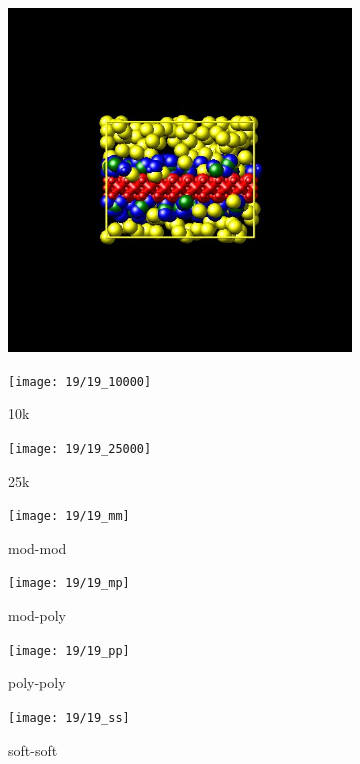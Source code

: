 \documentclass[a4paper]{article}
\begin{document}
\begin{figure}[H]
\begin{subfigure}{0.3\textwidth}
  \centering
  \includegraphics[width=\linewidth,keepaspectratio]{start}
  \caption{}
\end{subfigure}
\begin{subfigure}{0.3\textwidth}
  \centering
  \texttt{[image: 19/19\_10000]}
  \caption{10k}
\end{subfigure}
\begin{subfigure}{0.3\textwidth}
  \centering
  \texttt{[image: 19/19\_25000]}
  \caption{25k}
\end{subfigure}
\caption{}
\label{fig_1}
\end{figure}

\begin{figure}[H]
\begin{subfigure}{0.24\textwidth}
  \centering
  \texttt{[image: 19/19\_mm]}
  \caption{mod-mod}
\end{subfigure}
\begin{subfigure}{0.24\textwidth}
  \centering
  \texttt{[image: 19/19\_mp]}
  \caption{mod-poly}
\end{subfigure}
\begin{subfigure}{0.24\textwidth}
  \centering
  \texttt{[image: 19/19\_pp]}
  \caption{poly-poly}
\end{subfigure}
\begin{subfigure}{0.24\textwidth}
  \centering
  \texttt{[image: 19/19\_ss]}
  \caption{soft-soft}
\end{subfigure}
\caption{}
\label{fig_1}
\end{figure}
\end{document}
